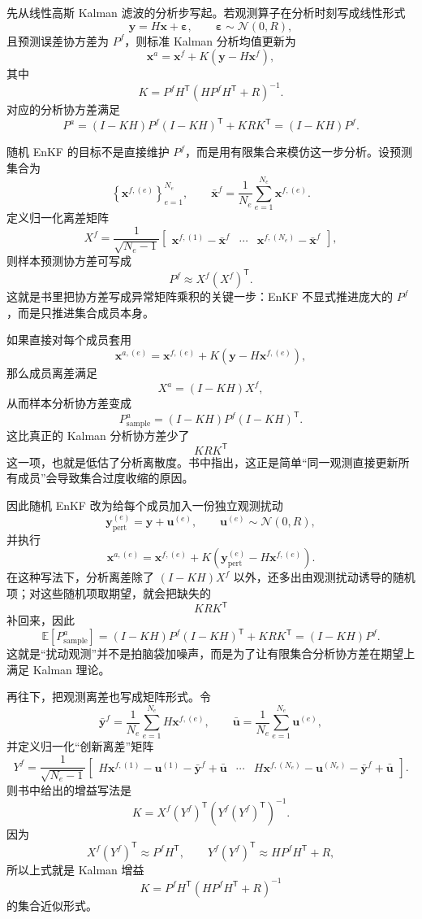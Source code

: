 \documentclass[12pt,a4paper]{article}
\begin{document}
先从线性高斯 Kalman 滤波的分析步写起。若观测算子在分析时刻写成线性形式
\[
\mathbf{y} = H\mathbf{x} + \boldsymbol{\varepsilon},
\qquad
\boldsymbol{\varepsilon}\sim\mathcal{N}(0,R),
\]
且预测误差协方差为 $P^f$，则标准 Kalman 分析均值更新为
\[
\mathbf{x}^a = \mathbf{x}^f + K(\mathbf{y}-H\mathbf{x}^f),
\]
其中
\[
K = P^f H^{\mathsf T}\left(H P^f H^{\mathsf T}+R\right)^{-1}.
\]
对应的分析协方差满足
\[
P^a = (I-KH)P^f(I-KH)^{\mathsf T} + K R K^{\mathsf T}
= (I-KH)P^f.
\]

随机 EnKF 的目标不是直接维护 $P^f$，而是用有限集合来模仿这一步分析。设预测集合为
\[
\left\{\mathbf{x}^{f,(e)}\right\}_{e=1}^{N_e},
\qquad
\bar{\mathbf{x}}^f=\frac{1}{N_e}\sum_{e=1}^{N_e}\mathbf{x}^{f,(e)}.
\]
定义归一化离差矩阵
\[
X^f
= \frac{1}{\sqrt{N_e-1}}
\begin{bmatrix}
\mathbf{x}^{f,(1)}-\bar{\mathbf{x}}^f &
\cdots &
\mathbf{x}^{f,(N_e)}-\bar{\mathbf{x}}^f
\end{bmatrix},
\]
则样本预测协方差可写成
\[
P^f \approx X^f (X^f)^{\mathsf T}.
\]
这就是书里把协方差写成异常矩阵乘积的关键一步：EnKF 不显式推进庞大的 $P^f$，而是只推进集合成员本身。

如果直接对每个成员套用
\[
\mathbf{x}^{a,(e)}=\mathbf{x}^{f,(e)}+K(\mathbf{y}-H\mathbf{x}^{f,(e)}),
\]
那么成员离差满足
\[
X^a = (I-KH)X^f,
\]
从而样本分析协方差变成
\[
P^a_{\mathrm{sample}}
= (I-KH)P^f(I-KH)^{\mathsf T}.
\]
这比真正的 Kalman 分析协方差少了
\[
K R K^{\mathsf T}
\]
这一项，也就是低估了分析离散度。书中指出，这正是简单“同一观测直接更新所有成员”会导致集合过度收缩的原因。

因此随机 EnKF 改为给每个成员加入一份独立观测扰动
\[
\mathbf{y}^{(e)}_{\mathrm{pert}}
= \mathbf{y} + \mathbf{u}^{(e)},
\qquad
\mathbf{u}^{(e)}\sim \mathcal{N}(0,R),
\]
并执行
\[
\mathbf{x}^{a,(e)}
= \mathbf{x}^{f,(e)}
+ K\left(\mathbf{y}^{(e)}_{\mathrm{pert}}-H\mathbf{x}^{f,(e)}\right).
\]
在这种写法下，分析离差除了 $(I-KH)X^f$ 以外，还多出由观测扰动诱导的随机项；对这些随机项取期望，就会把缺失的
\[
K R K^{\mathsf T}
\]
补回来，因此
\[
\mathbb{E}[P^a_{\mathrm{sample}}]
= (I-KH)P^f(I-KH)^{\mathsf T}+K R K^{\mathsf T}
= (I-KH)P^f.
\]
这就是“扰动观测”并不是拍脑袋加噪声，而是为了让有限集合分析协方差在期望上满足 Kalman 理论。

再往下，把观测离差也写成矩阵形式。令
\[
\bar{\mathbf{y}}^f = \frac{1}{N_e}\sum_{e=1}^{N_e}H\mathbf{x}^{f,(e)},
\qquad
\bar{\mathbf{u}} = \frac{1}{N_e}\sum_{e=1}^{N_e}\mathbf{u}^{(e)},
\]
并定义归一化“创新离差”矩阵
\[
Y^f
= \frac{1}{\sqrt{N_e-1}}
\begin{bmatrix}
H\mathbf{x}^{f,(1)}-\mathbf{u}^{(1)}-\bar{\mathbf{y}}^f+\bar{\mathbf{u}} &
\cdots &
H\mathbf{x}^{f,(N_e)}-\mathbf{u}^{(N_e)}-\bar{\mathbf{y}}^f+\bar{\mathbf{u}}
\end{bmatrix}.
\]
则书中给出的增益写法是
\[
K = X^f (Y^f)^{\mathsf T}\left(Y^f (Y^f)^{\mathsf T}\right)^{-1}.
\]
因为
\[
X^f (Y^f)^{\mathsf T}
\approx P^f H^{\mathsf T},
\qquad
Y^f (Y^f)^{\mathsf T}
\approx H P^f H^{\mathsf T} + R,
\]
所以上式就是 Kalman 增益
\[
K=P^f H^{\mathsf T}(H P^f H^{\mathsf T}+R)^{-1}
\]
的集合近似形式。
\end{document}
